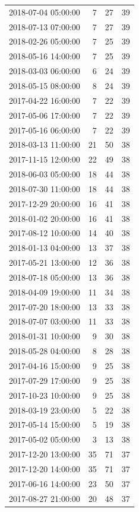 \begin{tabular}{lrrr}
2018-07-04 05:00:00 & 7 & 27 & 39 \\
2018-07-13 07:00:00 & 7 & 27 & 39 \\
2018-02-26 05:00:00 & 7 & 25 & 39 \\
2018-05-16 14:00:00 & 7 & 25 & 39 \\
2018-03-03 06:00:00 & 6 & 24 & 39 \\
2018-05-15 08:00:00 & 8 & 24 & 39 \\
2017-04-22 16:00:00 & 7 & 22 & 39 \\
2017-05-06 17:00:00 & 7 & 22 & 39 \\
2017-05-16 06:00:00 & 7 & 22 & 39 \\
2018-03-13 11:00:00 & 21 & 50 & 38 \\
2017-11-15 12:00:00 & 22 & 49 & 38 \\
2018-06-03 05:00:00 & 18 & 44 & 38 \\
2018-07-30 11:00:00 & 18 & 44 & 38 \\
2017-12-29 20:00:00 & 16 & 41 & 38 \\
2018-01-02 20:00:00 & 16 & 41 & 38 \\
2017-08-12 10:00:00 & 14 & 40 & 38 \\
2018-01-13 04:00:00 & 13 & 37 & 38 \\
2017-05-21 13:00:00 & 12 & 36 & 38 \\
2018-07-18 05:00:00 & 13 & 36 & 38 \\
2018-04-09 19:00:00 & 11 & 34 & 38 \\
2017-07-20 18:00:00 & 13 & 33 & 38 \\
2018-07-07 03:00:00 & 11 & 33 & 38 \\
2018-01-31 10:00:00 & 9 & 30 & 38 \\
2018-05-28 04:00:00 & 8 & 28 & 38 \\
2017-04-16 15:00:00 & 9 & 25 & 38 \\
2017-07-29 17:00:00 & 9 & 25 & 38 \\
2017-10-23 10:00:00 & 9 & 25 & 38 \\
2018-03-19 23:00:00 & 5 & 22 & 38 \\
2017-05-14 15:00:00 & 5 & 19 & 38 \\
2017-05-02 05:00:00 & 3 & 13 & 38 \\
2017-12-20 13:00:00 & 35 & 71 & 37 \\
2017-12-20 14:00:00 & 35 & 71 & 37 \\
2017-06-16 14:00:00 & 23 & 50 & 37 \\
2017-08-27 21:00:00 & 20 & 48 & 37 \\

\end{tabular}
